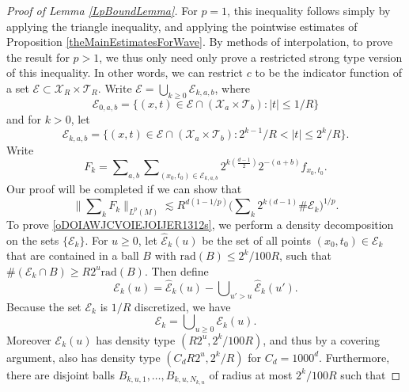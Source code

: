 \begin{proof}[Proof of Lemma \ref{LpBoundLemma}]

For $p = 1$, this inequality follows simply by applying the triangle inequality, and applying the pointwise estimates of Proposition \ref{theMainEstimatesForWave}. By methods of interpolation, to prove the result for $p > 1$, we thus only need only prove a restricted strong type version of this inequality. In other words, we can restrict $c$ to be the indicator function of a set $\mathcal{E} \subset \mathcal{X}_R \times \mathcal{T}_R$. Write $\mathcal{E} = \bigcup_{k \geq 0} \mathcal{E}_{k,a,b}$, where
%
\begin{equation}
    \mathcal{E}_{0,a,b} = \{ (x,t) \in \mathcal{E} \cap (\mathcal{X}_{a} \times \mathcal{T}_{b}) : |t| \leq 1/R \}
\end{equation}
%
and for $k > 0$, let
%
\begin{equation}
    \mathcal{E}_{k,a,b} = \{ (x,t) \in \mathcal{E} \cap (\mathcal{X}_{a} \times \mathcal{T}_{b}) : 2^{k-1} / R < |t| \leq 2^{k} / R \}.
\end{equation}
%
Write
%
\begin{equation}
    F_k = \sum\nolimits_{a,b} \sum\nolimits_{(x_0,t_0) \in \mathcal{E}_{k,a,b}} 2^{k \left( \frac{d-1}{2} \right)} 2^{-(a+b)} f_{x_0,t_0}.
\end{equation}
%
Our proof will be completed if we can show that
%
\begin{equation} \label{oDOIAWJCVOIEJOIJER1312s}
    \Big\| \sum\nolimits_k F_k \Big\|_{L^p(M)} \lesssim R^{d ( 1 - 1/p )} \Big( \sum\nolimits_k 2^{k(d-1)} \# \mathcal{E}_k \Big)^{1/p}.
\end{equation}
%
To prove \eqref{oDOIAWJCVOIEJOIJER1312s}, we perform a density decomposition on the sets $\{ \mathcal{E}_k \}$. For $u \geq 0$, let $\widehat{\mathcal{E}}_k(u)$ be the set of all points $(x_0,t_0) \in \mathcal{E}_k$ that are contained in a ball $B$ with $\text{rad}(B) \leq 2^{k} / 100 R$, such that $\#( \mathcal{E}_k \cap B ) \geq R 2^{u} \text{rad}(B)$. Then define
%
\begin{equation}
    \mathcal{E}_k(u) = \widehat{\mathcal{E}}_k(u) - \bigcup\nolimits_{u' > u} \widehat{\mathcal{E}}_k(u').
\end{equation}
%
Because the set $\mathcal{E}_k$ is $1/R$ discretized, we have
%
\begin{equation}
    \mathcal{E}_k = \bigcup\nolimits_{u \geq 0} \mathcal{E}_k(u).
\end{equation}
%
Moreover $\mathcal{E}_k(u)$ has density type $(R 2^{u}, 2^{k} / 100 R)$, and thus by a covering argument, also has density type $(C_d R 2^{u}, 2^{k} / R)$ for $C_d = 1000^d$. Furthermore, there are disjoint balls $B_{k,u,1},\dots,B_{k,u,N_{k,u}}$ of radius at most $2^{k} / 100 R$ such that

\end{proof}
